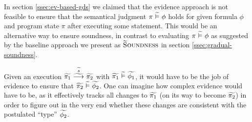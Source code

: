 In section \ref{ssec:ev-based-gds} we claimed that the evidence approach is not feasible to ensure that the semantical judgment $\evalgphiGen{\pi}{\phi}$ holds for given formula $\phi$ and program state $\pi$ after executing some statement.
This would be an alternative way to ensure soundness, in contrast to evaluating $\evalgphiGen{\pi}{\phi}$ as suggested by the baseline approach we present as $\tset{\gradT Soundness}$ in section \ref{ssec:gradual-soundness}.

Given an execution $\gsstepConsume{\grad{s}}{\grad{\pi_1}}{\grad{\pi_2}}$ with $\evalgphiGen{\grad{\pi_1}}{\grad{\phi_1}}$, it would have to be the job of evidence to ensure that $\evalgphiGen{\grad{\pi_2}}{\grad{\phi_2}}$.
One can imagine how complex evidence would have to be, as it effectively tracks all changes to $\grad{\pi_1}$ (on its way to become $\grad{\pi_2}$) in order to figure out in the very end whether these changes are consistent with the postulated “type” $\grad{\phi_2}$.

